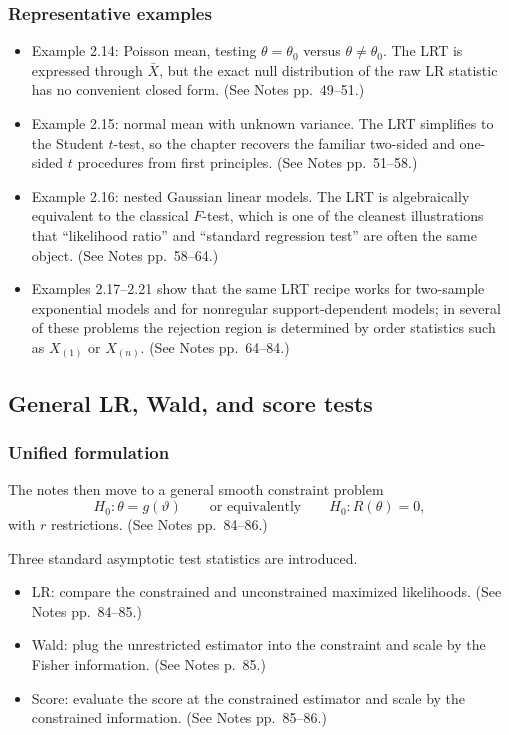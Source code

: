 \subsubsection{Representative examples}
\begin{itemize}
    \item Example 2.14: Poisson mean, testing $\theta=\theta_0$ versus $\theta \ne \theta_0$. The LRT is expressed through $\bar X$, but the exact null distribution of the raw LR statistic has no convenient closed form. (See Notes pp.~49--51.)
    \item Example 2.15: normal mean with unknown variance. The LRT simplifies to the Student $t$-test, so the chapter recovers the familiar two-sided and one-sided $t$ procedures from first principles. (See Notes pp.~51--58.)
    \item Example 2.16: nested Gaussian linear models. The LRT is algebraically equivalent to the classical $F$-test, which is one of the cleanest illustrations that ``likelihood ratio'' and ``standard regression test'' are often the same object. (See Notes pp.~58--64.)
    \item Examples 2.17--2.21 show that the same LRT recipe works for two-sample exponential models and for nonregular support-dependent models; in several of these problems the rejection region is determined by order statistics such as $X_{(1)}$ or $X_{(n)}$. (See Notes pp.~64--84.)
\end{itemize}

\subsection{General LR, Wald, and score tests}
\subsubsection{Unified formulation}
The notes then move to a general smooth constraint problem
\[
H_0:\theta = g(\vartheta)
\qquad \text{or equivalently} \qquad
H_0:R(\theta)=0,
\]
with $r$ restrictions. (See Notes pp.~84--86.)

Three standard asymptotic test statistics are introduced.

\begin{itemize}
    \item LR: compare the constrained and unconstrained maximized likelihoods. (See Notes pp.~84--85.)
    \item Wald: plug the unrestricted estimator into the constraint and scale by the Fisher information. (See Notes p.~85.)
    \item Score: evaluate the score at the constrained estimator and scale by the constrained information. (See Notes pp.~85--86.)
\end{itemize}

